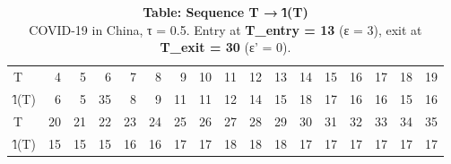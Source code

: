 \begin{table}[t]
\caption*{
{\large \textbf{Table: Sequence T → l̂(T)}} \\ 
{\small COVID-19 in China, τ = 0.5. Entry at \textbf{T\_entry = 13} (ε = 3), exit at \textbf{T\_exit = 30} (ε' = 0).}
} 
\begin{tabular*}{\linewidth}{@{\extracolsep{\fill}}lrrrrrrrrrrrrrrrr}
\toprule
 &  &  &  &  &  &  &  &  &  &  &  &  &  &  &  &  \\ 
\midrule\addlinespace[2.5pt]
T & 4 & 5 & 6 & 7 & 8 & 9 & 10 & 11 & 12 & 13 & 14 & 15 & 16 & 17 & 18 & 19 \\ 
l̂(T) & 6 & 5 & 35 & 8 & 9 & 11 & 11 & 12 & 14 & 15 & 18 & 17 & 16 & 16 & 15 & 16 \\ 
T & 20 & 21 & 22 & 23 & 24 & 25 & 26 & 27 & 28 & 29 & 30 & 31 & 32 & 33 & 34 & 35 \\ 
l̂(T) & 15 & 15 & 15 & 16 & 16 & 17 & 17 & 18 & 18 & 18 & 17 & 17 & 17 & 17 & 17 & 17 \\ 
\bottomrule
\end{tabular*}
\end{table}

